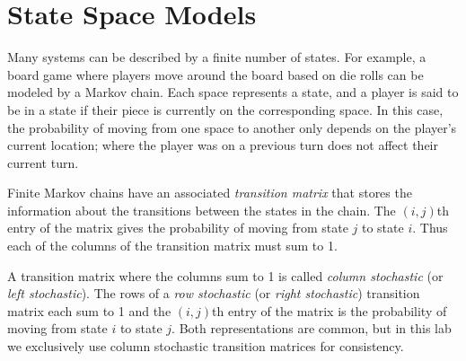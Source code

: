 \label{lab:Markov}

\section*{State Space Models} %

Many systems can be described by a finite number of states.
For example, a board game where players move around the board based on die rolls can be modeled by a Markov chain.
Each space represents a state, and a player is said to be in a state if their piece is currently on the corresponding space.
In this case, the probability of moving from one space to another only depends on the player's current location; where the player was on a previous turn does not affect their current turn.

Finite Markov chains have an associated \emph{transition matrix} that stores the information about the transitions between the states in the chain.
The $(i,j)$th entry of the matrix gives the probability of moving from state $j$ to state $i$.
Thus each of the columns of the transition matrix must sum to 1.

\begin{info} %
A transition matrix where the columns sum to 1 is called \emph{column stochastic} (or \emph{left stochastic}).
The rows of a \emph{row stochastic} (or \emph{right stochastic}) transition matrix each sum to 1 and the $(i,j)$th entry of the matrix is the probability of moving from state $i$ to state $j$.
Both representations are common, but in this lab we exclusively use column stochastic transition matrices for consistency.
\end{info}

